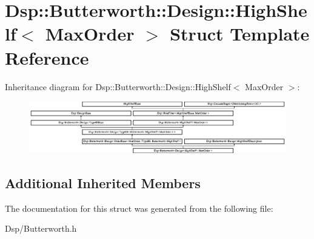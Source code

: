\hypertarget{structDsp_1_1Butterworth_1_1Design_1_1HighShelf}{\section{Dsp\-:\-:Butterworth\-:\-:Design\-:\-:High\-Shelf$<$ Max\-Order $>$ Struct Template Reference}
\label{structDsp_1_1Butterworth_1_1Design_1_1HighShelf}
}
Inheritance diagram for Dsp\-:\-:Butterworth\-:\-:Design\-:\-:High\-Shelf$<$ Max\-Order $>$\-:\begin{figure}[H]
\begin{center}
\leavevmode
\includegraphics[height=2.299795cm]{structDsp_1_1Butterworth_1_1Design_1_1HighShelf}
\end{center}
\end{figure}
\subsection*{Additional Inherited Members}


The documentation for this struct was generated from the following file\-:\begin{DoxyCompactItemize}
\item 
Dsp/Butterworth.\-h\end{DoxyCompactItemize}
